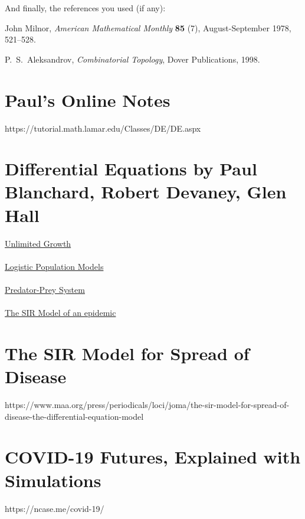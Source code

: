 \documentclass{amsart}
\theoremstyle{definition}
\numberwithin{equation}{section}
\begin{document}
\begin{sansmath}
\bigskip



And finally, the references you used (if any):


\begin{thebibliography}{12}

John Milnor, {\it
 American Mathematical Monthly}
    {\bf 85} (7), August-September 1978, 521--528.

 \smallskip

    P.~S.~Aleksandrov, {\it Combinatorial Topology},
    Dover Publications, 1998.


\end{thebibliography}

\newpage
\section{Paul's Online Notes}
https://tutorial.math.lamar.edu/Classes/DE/DE.aspx\\
\lipsum[0-2]

\section{Differential Equations by Paul Blanchard, Robert Devaney, Glen Hall}
\underline{Unlimited Growth}\\ %
\lipsum[2-4]\\
\underline{Logistic Population Models}\\ %
\lipsum[4-6]\\
\underline{Predator-Prey System}\\ %
\lipsum[6-8]\\
\underline{The SIR Model of an epidemic}\\ %
\lipsum[8-10]

\section{The SIR Model for Spread of Disease}
https://www.maa.org/press/periodicals/loci/joma/the-sir-model-for-spread-of-disease-the-differential-equation-model\\
\lipsum[0-2]

\section{COVID-19 Futures, Explained with Simulations}
https://ncase.me/covid-19/\\
\lipsum[3-5]


\end{sansmath}
\end{document}
